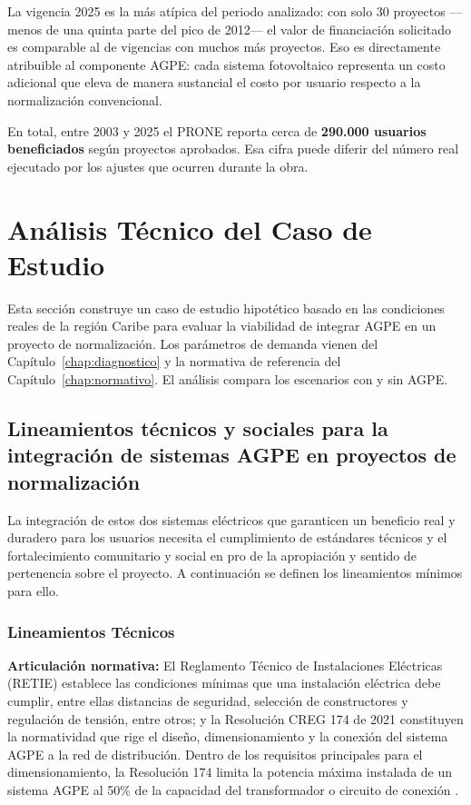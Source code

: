 La vigencia 2025 es la más atípica del periodo analizado: con solo 30
proyectos —menos de una quinta parte del pico de 2012— el valor de
financiación solicitado es comparable al de vigencias con muchos más
proyectos. Eso es directamente atribuible al componente AGPE: cada
sistema fotovoltaico representa un costo adicional que eleva de manera
sustancial el costo por usuario respecto a la normalización convencional.

En total, entre 2003 y 2025 el PRONE reporta cerca de \textbf{290.000
usuarios beneficiados} según proyectos aprobados. Esa cifra puede
diferir del número real ejecutado por los ajustes que ocurren durante
la obra.


\section{Análisis Técnico del Caso de Estudio}
\label{sec:caso_tecnico}

Esta sección construye un caso de estudio hipotético basado en las
condiciones reales de la región Caribe para evaluar la viabilidad de
integrar AGPE en un proyecto de normalización. Los parámetros de
demanda vienen del Capítulo~\ref{chap:diagnostico} y la normativa de
referencia del Capítulo~\ref{chap:normativo}. El análisis compara los
escenarios con y sin AGPE.

\subsection{Lineamientos técnicos y sociales para la integración de sistemas AGPE en proyectos de normalización}
\label{subsec:lineamientos_agpe}

La integración de estos dos sistemas eléctricos que garanticen un beneficio real y duradero para los usuarios necesita el cumplimiento de estándares técnicos y el fortalecimiento comunitario y social en pro de la apropiación y sentido de pertenencia sobre el proyecto. A continuación se definen los lineamientos mínimos para ello.

\subsubsection{Lineamientos Técnicos}

\textbf{Articulación normativa:} El Reglamento Técnico de Instalaciones Eléctricas (RETIE) establece las condiciones mínimas que una instalación eléctrica debe cumplir, entre ellas distancias de seguridad, selección de constructores y regulación de tensión, entre otros; y la Resolución CREG 174 de 2021 constituyen la normatividad que rige el diseño, dimensionamiento y la conexión del sistema AGPE a la red de distribución. Dentro de los requisitos principales para el dimensionamiento, la Resolución 174 limita la potencia máxima instalada de un sistema AGPE al 50\% de la capacidad del transformador o circuito de conexión \parencite{ResolucionCREG174_2021}.

